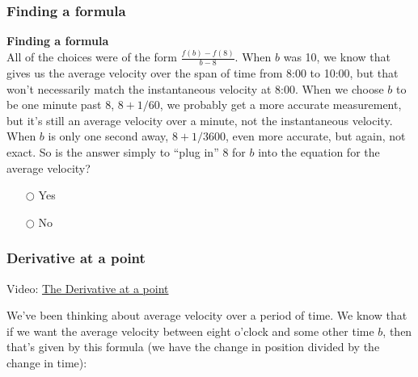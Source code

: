 \documentclass[pdftex, brazil, 12pt, twoside]{article}
\begin{document}
\subsubsection{Finding a formula}
\label{u1-what-formula}

\begin{exercise}
  \textbf{Finding a formula}\\%
  All of the choices were of the form
  $\displaystyle \frac{f(b)-f(8)}{b-8}$. When $b$ was 10, we know that gives us
  the average velocity over the span of time from 8:00 to 10:00, but that won't
  necessarily match the instantaneous velocity at 8:00. When we choose $b$ to be
  one minute past 8, $8 + 1/60$, we probably get a more accurate measurement,
  but it's still an average velocity over a minute, not the instantaneous velocity.
  When $b$ is only one second away, $8 + 1/3600$, even more accurate, but again,
  not exact. So is the answer simply to ``plug in'' 8 for $b$ into the equation for
  the average velocity?
\begin{itemize}[noitemsep]
\item[$\bigcirc$] Yes
\item[$\bigcirc$] No
\end{itemize}
\end{exercise}

\subsubsection{Derivative at a point}
\label{u1-what-derivative-at-a-point}

Video: \href{https://www.youtube.com/watch?v=ABT4OYvSAZ4}{The Derivative at a point}

We've been thinking about average velocity
over a period of time.
We know that if we want the average velocity between eight
o'clock and some other time $b$, then
that's given by this formula (we have the change in position divided by the change
in time):

\begin{figure}[H]
  \begin{center}
  \end{center}
\end{figure}
\end{document}
